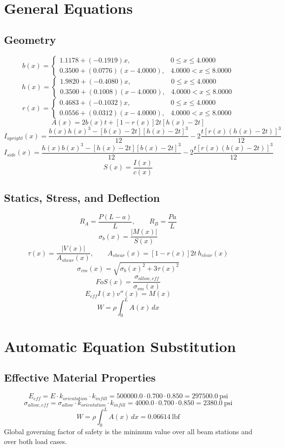 \documentclass[11pt]{article}
\begin{document}
\section*{General Equations}
\subsection*{Geometry}
\[
b(x)=\begin{cases}1.1178 + (-0.1919)x, & 0 \le x \le 4.0000\\0.3500 + (0.0776)(x-4.0000), & 4.0000 < x \le 8.0000\end{cases}
\]
\[
h(x)=\begin{cases}1.9820 + (-0.4080)x, & 0 \le x \le 4.0000\\0.3500 + (0.1008)(x-4.0000), & 4.0000 < x \le 8.0000\end{cases}
\]
\[
r(x)=\begin{cases}0.4683 + (-0.1032)x, & 0 \le x \le 4.0000\\0.0556 + (0.0312)(x-4.0000), & 4.0000 < x \le 8.0000\end{cases}
\]
\[
A(x)=2b(x)t+[1-r(x)]2t[h(x)-2t]
\]
\[
I_{upright}(x)=\frac{b(x)h(x)^3-[b(x)-2t][h(x)-2t]^3}{12}-2\frac{t[r(x)(h(x)-2t)]^3}{12}
\]
\[
I_{side}(x)=\frac{h(x)b(x)^3-[h(x)-2t][b(x)-2t]^3}{12}-2\frac{t[r(x)(b(x)-2t)]^3}{12}
\]
\[
S(x)=\frac{I(x)}{c(x)}
\]

\subsection*{Statics, Stress, and Deflection}
\[
R_A=\frac{P(L-a)}{L}, \qquad R_B=\frac{Pa}{L}
\]
\[
\sigma_b(x)=\frac{|M(x)|}{S(x)}
\]
\[
\tau(x)=\frac{|V(x)|}{A_{shear}(x)}, \qquad A_{shear}(x)=[1-r(x)]2t\,h_{clear}(x)
\]
\[
\sigma_{vm}(x)=\sqrt{\sigma_b(x)^2+3\tau(x)^2}
\]
\[
FoS(x)=\frac{\sigma_{allow,eff}}{\sigma_{vm}(x)}
\]
\[
E_{eff}I(x)v''(x)=M(x)
\]
\[
W=\rho\int_0^L A(x)\,dx
\]

\section*{Automatic Equation Substitution}
\subsection*{Effective Material Properties}
\[E_{eff} = E \cdot k_{orientation} \cdot k_{infill} = 500000.0 \cdot 0.700 \cdot 0.850 = 297500.0\ \mathrm{psi}\]
\[\sigma_{allow,eff} = \sigma_{allow} \cdot k_{orientation} \cdot k_{infill} = 4000.0 \cdot 0.700 \cdot 0.850 = 2380.0\ \mathrm{psi}\]
\[W = \rho \int_0^L A(x)\,dx = 0.06614\ \mathrm{lbf}\]
Global governing factor of safety is the minimum value over all beam stations and over both load cases.
\end{document}
